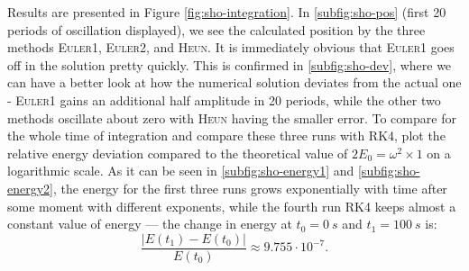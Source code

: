 \documentclass[]{article}
\newcommand{\eulerOne}{\textsc{Euler1}}
\newcommand{\eulerTwo}{\textsc{Euler2}}
\newcommand{\heun}{\textsc{Heun}}
\newcommand{\rkFour}{\textsc{RK4}}
\begin{document}
	Results are presented in Figure \ref{fig:sho-integration}. In \ref{subfig:sho-pos} (first 20 periods of oscillation displayed), we see the calculated position by the three methods \eulerOne{}, \eulerTwo{}, and \heun{}. It is immediately obvious that \eulerOne{} goes off in the solution pretty quickly. This is confirmed in \ref{subfig:sho-dev}, where we can have a better look at how the numerical solution deviates from the actual one - \eulerOne{} gains an additional half amplitude in 20 periods, while the other two methods oscillate about zero with \heun{} having the smaller error. To compare for the whole time of integration and compare these three runs with \rkFour{}, plot the relative energy deviation compared to the theoretical value of $2E_0 = \omega^2 \times 1$ on a logarithmic scale. As it can be seen in \ref{subfig:sho-energy1} and \ref{subfig:sho-energy2}, the energy for the first three runs grows exponentially with time after some moment with different exponents, while the fourth run \rkFour{} keeps almost a constant value of energy --- the change in energy at $t_0=\SI{0}{s}$ and $t_1=\SI{100}{s}$ is:
	\begin{equation}
		\frac{\big| E(t_1) - E(t_0) \big|}{E(t_0)} \approx 9.755 \cdot 10^{-7}.
	\end{equation}
\end{document}
